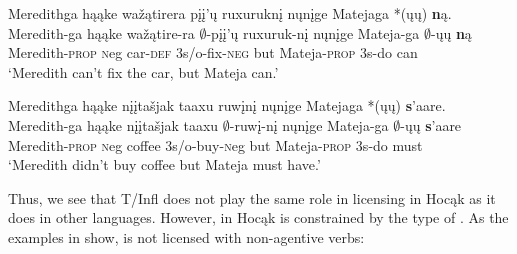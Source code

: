 \documentclass[output=paper]{LSP/langsci}
\begin{document}
\ex\label{ex:johnson:19b} 
\glll Meredithga hąąke wažątirera {pįį'ų ruxuruknį} nųnįge Matejaga *(ųų) {\textbf ną}.\\
Meredith-ga hąąke wažątire-ra {$\emptyset$-pįį'ų ruxuruk-nį} nųnįge Mateja-ga $\emptyset$-ųų {\textbf ną}\\
Meredith-\textsc{prop} {\textsc neg} car-\textsc{def} {\textsc 3s/o}-fix-\textsc{neg} but Mateja-\textsc{prop} {\textsc 3s}-do can\\
\trans `Meredith can't fix the car, but Mateja can.'
 
\ex\label{ex:johnson:19c} 
\glll Meredithga hąąke {nįįtašjak taaxu} ruwįnį nųnįge Matejaga *(ųų) {\textbf s'aare}.\\ 
Meredith-ga hąąke {nįįtašjak taaxu} $\emptyset$-ruwį-nį nųnįge Mateja-ga $\emptyset$-ųų {\textbf s'aare}\\
Meredith-\textsc{prop} {\textsc neg} coffee {\textsc 3s/o}-buy-{\textsc neg} but Mateja-\textsc{prop} {\textsc 3s}-do must\\
\trans `Meredith didn't buy coffee but Mateja must have.' 
\z
\z

Thus, we see that T/Infl does not play the same role in  licensing in Hocąk as it does in other languages. However,  in Hocąk is constrained by the type of . As the examples in  show,  is not licensed with non-agentive verbs:

 
\ea\label{ex:johnson:20}
\label{ex:johnson:20a}
\label{ex:johnson:20b}
\label{ex:johnson:20c}
\label{ex:johnson:20d}
\z
\z
\end{document}
